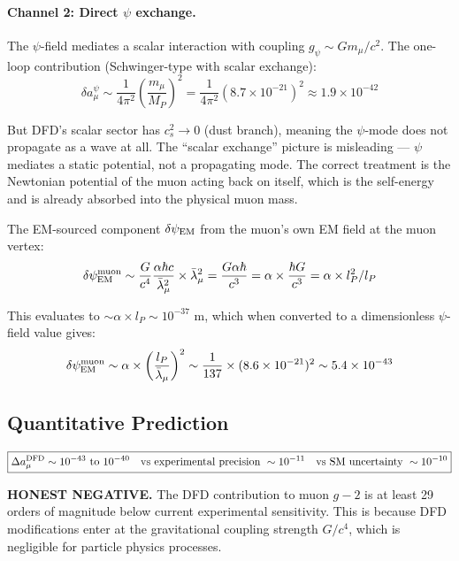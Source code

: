 \documentclass[11pt]{article}
\begin{document}
\paragraph{Channel 2: Direct $\psi$ exchange.}
The $\psi$-field mediates a scalar interaction with coupling
$g_\psi \sim Gm_\mu/c^2$.  The one-loop contribution (Schwinger-type
with scalar exchange):
\begin{equation}
\delta a_\mu^{\psi} \sim \frac{1}{4\pi^2}\left(\frac{m_\mu}{M_P}\right)^2
= \frac{1}{4\pi^2}(8.7 \times 10^{-21})^2
\approx 1.9 \times 10^{-42}
\end{equation}

But DFD's scalar sector has $c_s^2 \to 0$ (dust branch), meaning the
$\psi$-mode does not propagate as a wave at all.  The ``scalar exchange''
picture is misleading --- $\psi$ mediates a static potential, not a
propagating mode.  The correct treatment is the Newtonian potential
of the muon acting back on itself, which is the self-energy and is
already absorbed into the physical muon mass.

The EM-sourced component $\delta\psi_{\rm EM}$ from the muon's own EM
field at the muon vertex:
\begin{equation}
\delta\psi_{\rm EM}^{\rm muon} \sim \frac{G}{c^4}\frac{\alpha\hbar c}{\bar\lambda_\mu^2}
\times \bar\lambda_\mu^2
= \frac{G\alpha\hbar}{c^3}
= \alpha \times \frac{\hbar G}{c^3}
= \alpha \times l_P^2 / l_P
\end{equation}

This evaluates to $\sim \alpha \times l_P \sim 10^{-37}$ m, which when
converted to a dimensionless $\psi$-field value gives:
\begin{equation}
\delta\psi_{\rm EM}^{\rm muon} \sim \alpha \times \left(\frac{l_P}{\bar\lambda_\mu}\right)^2
\sim \frac{1}{137} \times (8.6 \times 10^{-21})^2
\sim 5.4 \times 10^{-43}
\end{equation}

\subsection{Quantitative Prediction}

\begin{equation}
\boxed{
\Delta a_\mu^{\rm DFD} \sim 10^{-43} \text{ to } 10^{-40}
\quad\text{vs experimental precision } \sim 10^{-11}
\quad\text{vs SM uncertainty } \sim 10^{-10}
}
\end{equation}

\textbf{HONEST NEGATIVE.}  The DFD contribution to muon $g-2$ is at
least 29 orders of magnitude below current experimental sensitivity.
This is because DFD modifications enter at the gravitational coupling
strength $G/c^4$, which is negligible for particle physics processes.
\end{document}
